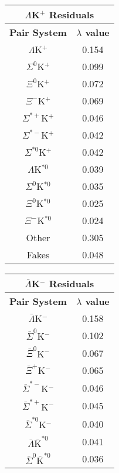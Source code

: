 \documentclass[ALICE,manyauthors]{cernphprep}
\begin{document}
\begin{table}[htbp]
 \centering
 \begin{minipage}{0.3\textwidth}
  \centering 
  \begin{tabular}{|c|c|}
   \multicolumn{2}{c}{$\Lambda$K$^{+}$ Residuals} \\
   \hline
   \textbf{Pair System} & \textbf{$\lambda$ value} \\
   \hline
   $\Lambda$K$^{+}$ & 0.154 \\
   $\Sigma^{0}$K$^{+}$ & 0.099 \\
   $\Xi^{0}$K$^{+}$ & 0.072 \\
   $\Xi^{-}$K$^{+}$ & 0.069 \\
   $\Sigma^{*+}$K$^{+}$ & 0.046 \\
   $\Sigma^{*-}$K$^{+}$ & 0.042 \\
   $\Sigma^{*0}$K$^{+}$ & 0.042 \\
   $\Lambda$K$^{*0}$ & 0.039 \\
   $\Sigma^{0}$K$^{*0}$ & 0.035 \\
   $\Xi^{0}$K$^{*0}$ & 0.025 \\
   $\Xi^{-}$K$^{*0}$ & 0.024 \\
   Other & 0.305 \\
   Fakes & 0.048 \\
   \hline
  \end{tabular}
 \end{minipage} 
 \begin{minipage}{0.3\textwidth}
  \centering 
  \begin{tabular}{|c|c|}
   \multicolumn{2}{c}{$\bar{\Lambda}$K$^{-}$ Residuals} \\
   \hline
   \textbf{Pair System} & \textbf{$\lambda$ value} \\
   \hline
   $\bar{\Lambda}$K$^{-}$ & 0.158 \\
   $\bar{\Sigma}^{0}$K$^{-}$ & 0.102 \\
   $\bar{\Xi}^{0}$K$^{-}$ & 0.067 \\
   $\bar{\Xi}^{+}$K$^{-}$ & 0.065 \\
   $\bar{\Sigma}^{*-}$K$^{-}$ & 0.046 \\
   $\bar{\Sigma}^{*+}$K$^{-}$ & 0.045 \\
   $\bar{\Sigma}^{*0}$K$^{-}$ & 0.040 \\
   $\bar{\Lambda}\bar{\mathrm{K}}^{*0}$ & 0.041 \\
   $\bar{\Sigma}^{0}\bar{\mathrm{K}}^{*0}$ & 0.036 \\

\end{tabular}
\end{minipage}
\end{table}
\end{document}
